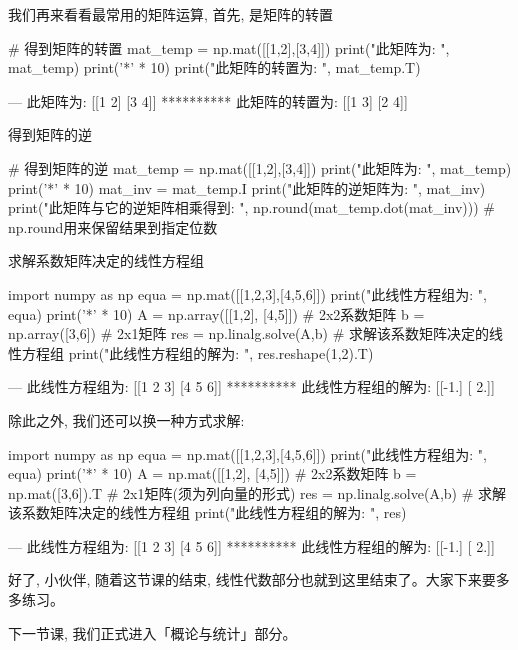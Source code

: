 我们再来看看最常用的矩阵运算, 首先, 是矩阵的转置

\begin{python}
# 得到矩阵的转置
mat_temp = np.mat([[1,2],[3,4]])
print("此矩阵为: \n", mat_temp)
print('*' * 10)
print("此矩阵的转置为: \n", mat_temp.T)

---
此矩阵为: 
 [[1 2]
 [3 4]]
**********
此矩阵的转置为: 
 [[1 3]
 [2 4]]
\end{python}

得到矩阵的逆

\begin{python}
# 得到矩阵的逆
mat_temp = np.mat([[1,2],[3,4]])
print("此矩阵为: \n", mat_temp)
print('*' * 10)
mat_inv = mat_temp.I
print("此矩阵的逆矩阵为: \n", mat_inv)
print("此矩阵与它的逆矩阵相乘得到: \n", np.round(mat_temp.dot(mat_inv)))    # np.round用来保留结果到指定位数
\end{python}

求解系数矩阵决定的线性方程组

\begin{python}
import numpy as np
equa = np.mat([[1,2,3],[4,5,6]])
print("此线性方程组为: \n", equa)
print('*' * 10)
A = np.array([[1,2], [4,5]])   # 2x2系数矩阵
b = np.array([3,6])            # 2x1矩阵
res = np.linalg.solve(A,b)     # 求解该系数矩阵决定的线性方程组
print("此线性方程组的解为: \n", res.reshape(1,2).T)

---
此线性方程组为: 
 [[1 2 3]
 [4 5 6]]
**********
此线性方程组的解为: 
 [[-1.]
 [ 2.]]
\end{python}

除此之外, 我们还可以换一种方式求解: 


\begin{python}
import numpy as np
equa = np.mat([[1,2,3],[4,5,6]])
print("此线性方程组为: \n", equa)
print('*' * 10)
A = np.mat([[1,2], [4,5]])   # 2x2系数矩阵
b = np.mat([3,6]).T  # 2x1矩阵(须为列向量的形式)
res = np.linalg.solve(A,b)   # 求解该系数矩阵决定的线性方程组
print("此线性方程组的解为: \n", res)

---
此线性方程组为: 
 [[1 2 3]
 [4 5 6]]
**********
此线性方程组的解为: 
 [[-1.]
 [ 2.]]
\end{python}

好了, 小伙伴, 随着这节课的结束, 线性代数部分也就到这里结束了。大家下来要多多练习。

下一节课, 我们正式进入「概论与统计」部分。